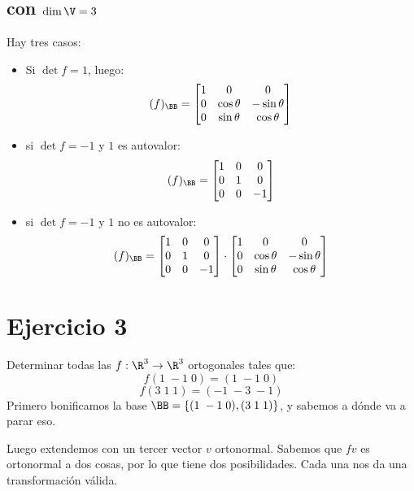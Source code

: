 \documentclass{article}
\begin{document}
\subsection*{con $\dim \V = 3$}
Hay tres casos:
\begin{itemize}
    \item Si $\det f = 1$, luego:
        \[
            (f)_\BB = \begin{bmatrix}
                1& 0& 0 \\
                0& \cos \theta & -\sin \theta \\
                0& \sin \theta & \cos \theta \\
            \end{bmatrix}
        \]
    \item si $\det f = -1$ y $1$ es autovalor:
        \[
            (f)_\BB = \begin{bmatrix}
                1& 0& 0 \\
                0& 1 & 0\\
                0& 0 & -1\\
            \end{bmatrix}
        \]
    \item si $\det f = -1$ y $1$ no es autovalor:
        \[
            (f)_\BB = \begin{bmatrix}
                1& 0& 0 \\
                0& 1 & 0\\
                0& 0 & -1\\
            \end{bmatrix} \cdot
            \begin{bmatrix}
                1& 0& 0 \\
                0& \cos \theta & -\sin \theta \\
                0& \sin \theta & \cos \theta \\
            \end{bmatrix}
        \]
\end{itemize}
\section*{Ejercicio 3}
Determinar todas las $f:\R^3 \to \R^3$ ortogonales tales que:
\[
    f(1 \; -1 \; 0) = (1 \; -1 \; 0)
\]
\[
    f(3 \; 1 \; 1) = (-1 \; -3 \; -1)
\]
Primero bonificamos la base $\BB = \{(1 \; -1 \; 0), (3 \; 1 \; 1)\}$, y sabemos a dónde va a parar eso.

Luego extendemos con un tercer vector $v$ ortonormal. Sabemos que $f v$ es ortonormal a dos cosas, por lo que tiene dos posibilidades. Cada una nos da una transformación válida.
\end{document}
